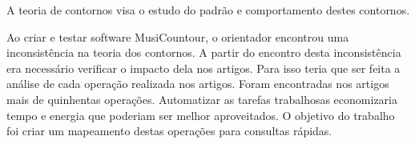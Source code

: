\documentclass[11pt]{article}
\begin{document}
A teoria de contornos visa o estudo do padrão e comportamento destes contornos.






Ao criar e testar software MusiCountour, o orientador encontrou
uma inconsistência na teoria dos contornos.
A partir do encontro desta inconsistência era necessário verificar o 
impacto dela nos artigos. Para isso teria que ser feita a análise de cada
operação realizada nos artigos.
Foram encontradas nos artigos mais de quinhentas operações. Automatizar 
as tarefas trabalhosas economizaria tempo e energia que poderiam ser 
melhor aproveitados.
O objetivo do trabalho foi criar um mapeamento destas operações para
consultas rápidas. 
\end{document}
